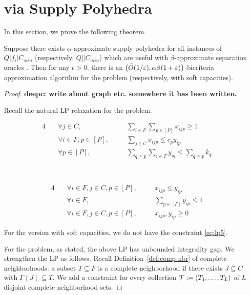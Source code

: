 \newpage \section{\mckc via Supply Polyhedra}
In this section, we prove the following theorem.
\begin{theorem}\label{thm:reduction}
Suppose there exists $\alpha$-approximate supply polyhedra  for all instances of $Q|f_i|C_{min}$ (respectively, $Q||C_{min}$) which are useful with $\beta$-approximate separation oracles .
Then for any $\epsilon> 0$, there is an $\left(\tilde{O}(1/\varepsilon),\alpha\beta(1+\varepsilon)\right)$-bicriteria approximation algorithm for the \mckc problem (respectively, with soft capacities).
\end{theorem}
\begin{proof}{\bf deepc: write about graph etc. somewhere it has been written.}\smallskip
	
\noindent
Recall the natural LP relaxation for the \mckc problem.

\begin{minipage}{0.45\textwidth}
	\begin{alignat}{4}
		& \quad \forall j\in C,   &&\quad  \textstyle \sum_{i\in F} \sum_{p\in [P]}  x_{ijp} \geq 1 \label{eq:lp1} \\
		& \quad \forall i\in F,p\in [P] ,  &&\quad  \textstyle \sum_{j\in C}  x_{ijp} \leq c_py_{ip} \label{eq:lp2} \\
		& \quad \forall p\in [P], && \quad \textstyle \sum_{q \geq p} \sum_{i\in F} y_{iq}   \leq \sum_{q\geq p} k_q \label{eq:lp3}  
	\end{alignat}
\end{minipage}
~\vline~
\begin{minipage}{0.45\textwidth}
	\begin{alignat}{4}
		& \quad \forall i\in F, j\in C,p\in [P],  && \quad x_{ijp} \leq y_{ip}\label{eq:lp4}   \\
		& \quad \forall i\in F, && \quad \textstyle\sum_{p\in [P]} y_{ip} \leq 1 \label{eq:lp5}  \\
		& \quad \forall i\in F,j\in C,p\in [P], && \quad x_{ijp},y_{ip} \geq 0\label{eq:lp6}
	\end{alignat}
\end{minipage}
\smallskip

\noindent
For the version with soft capacities, we do not have the constraint \eqref{eq:lp5}. \smallskip

For the \mckc problem, as stated, the above LP has unbounded integrality gap. We strengthen the LP as follows.
Recall Definition~\ref{def:comp-nbr} of complete neighborhoods: a subset $T\subseteq F$ is a complete neighborhood 
if there exists $J\subseteq C$ with $\Gamma(J) \subseteq T$. We add a constraint for every collection ${\cal T} := (T_1,\ldots,T_L)$ of $L$ disjoint complete neighborhood sets. 


\end{proof}
